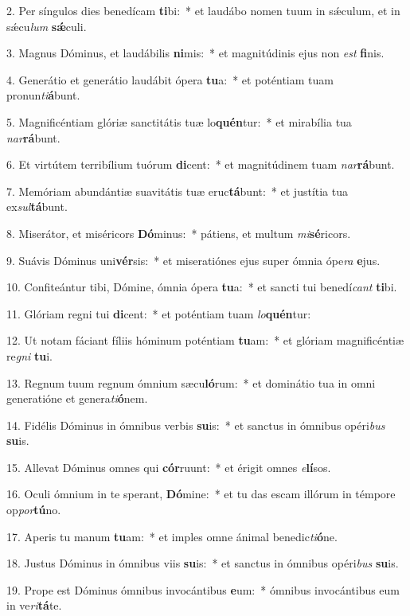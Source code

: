2. Per síngulos dies benedícam \textbf{ti}bi:~*  et laudábo nomen tuum in sǽculum, et in sǽcu\textit{lum} \textbf{sǽ}culi.\

3. Magnus Dóminus, et laudábilis \textbf{ni}mis:~*  et magnitúdinis ejus non \textit{est} \textbf{fi}nis.\

4. Generátio et generátio laudábit ópera \textbf{tu}a:~*  et poténtiam tuam pronun\textit{ti}\textbf{á}bunt.\

5. Magnificéntiam glóriæ sanctitátis tuæ lo\textbf{quén}tur:~*  et mirabília tua \textit{nar}\textbf{rá}bunt.\

6. Et virtútem terribílium tuórum \textbf{di}cent:~*  et magnitúdinem tuam \textit{nar}\textbf{rá}bunt.\

7. Memóriam abundántiæ suavitátis tuæ eruc\textbf{tá}bunt:~*  et justítia tua ex\textit{sul}\textbf{tá}bunt.\

8. Miserátor, et miséricors \textbf{Dó}minus:~*  pátiens, et multum \textit{mi}\textbf{sé}ricors.\

9. Suávis Dóminus uni\textbf{vér}sis:~*  et miseratiónes ejus super ómnia ópe\textit{ra} \textbf{e}jus.\

10. Confiteántur tibi, Dómine, ómnia ópera \textbf{tu}a:~*  et sancti tui benedí\textit{cant} \textbf{ti}bi.\

11. Glóriam regni tui \textbf{di}cent:~*  et poténtiam tuam \textit{lo}\textbf{quén}tur:\

12. Ut notam fáciant fíliis hóminum poténtiam \textbf{tu}am:~*  et glóriam magnificéntiæ re\textit{gni} \textbf{tu}i.\

13. Regnum tuum regnum ómnium sæcu\textbf{ló}rum:~*  et dominátio tua in omni generatióne et genera\textit{ti}\textbf{ó}nem.\

14. Fidélis Dóminus in ómnibus verbis \textbf{su}is:~*  et sanctus in ómnibus opéri\textit{bus} \textbf{su}is.\

15. Allevat Dóminus omnes qui \textbf{cór}ruunt:~*  et érigit omnes \textit{e}\textbf{lí}sos.\

16. Oculi ómnium in te sperant, \textbf{Dó}mine:~*  et tu das escam illórum in témpore op\textit{por}\textbf{tú}no.\

17. Aperis tu manum \textbf{tu}am:~*  et imples omne ánimal benedic\textit{ti}\textbf{ó}ne.\

18. Justus Dóminus in ómnibus viis \textbf{su}is:~*  et sanctus in ómnibus opéri\textit{bus} \textbf{su}is.\

19. Prope est Dóminus ómnibus invocántibus \textbf{e}um:~*  ómnibus invocántibus eum in ve\textit{ri}\textbf{tá}te.\

